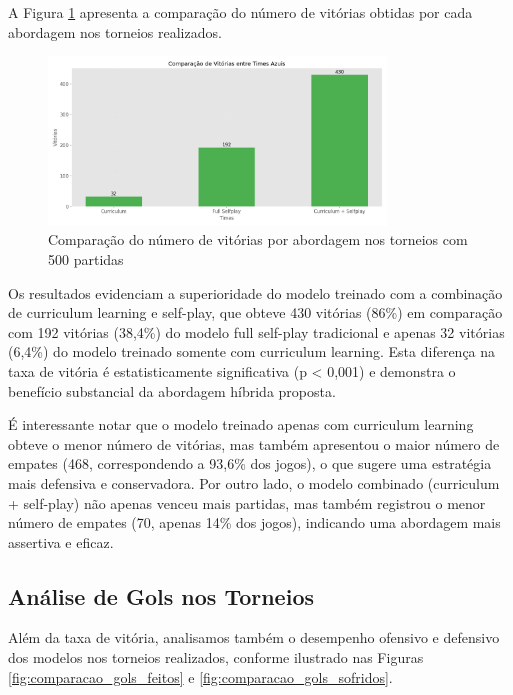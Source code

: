 A Figura \ref{fig:comparacao_vitorias} apresenta a comparação do número de vitórias obtidas por cada abordagem nos torneios realizados.

\begin{figure}[H]
    \centering
    \includegraphics[width=0.8\textwidth]{fig/graficos_trabalho/graficos_torneios/geral/comparacao_vitorias.png}
    \caption{Comparação do número de vitórias por abordagem nos torneios com 500 partidas}
    \label{fig:comparacao_vitorias}
\end{figure}

Os resultados evidenciam a superioridade do modelo treinado com a combinação de curriculum learning e self-play, que obteve 430 vitórias (86\%) em comparação com 192 vitórias (38,4\%) do modelo full self-play tradicional e apenas 32 vitórias (6,4\%) do modelo treinado somente com curriculum learning. Esta diferença na taxa de vitória é estatisticamente significativa (p < 0,001) e demonstra o benefício substancial da abordagem híbrida proposta.

É interessante notar que o modelo treinado apenas com curriculum learning obteve o menor número de vitórias, mas também apresentou o maior número de empates (468, correspondendo a 93,6\% dos jogos), o que sugere uma estratégia mais defensiva e conservadora. Por outro lado, o modelo combinado (curriculum + self-play) não apenas venceu mais partidas, mas também registrou o menor número de empates (70, apenas 14\% dos jogos), indicando uma abordagem mais assertiva e eficaz.

\subsection{Análise de Gols nos Torneios}

Além da taxa de vitória, analisamos também o desempenho ofensivo e defensivo dos modelos nos torneios realizados, conforme ilustrado nas Figuras \ref{fig:comparacao_gols_feitos} e \ref{fig:comparacao_gols_sofridos}.

